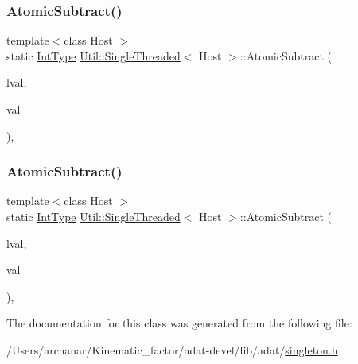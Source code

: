 \mbox{\label{classUtil_1_1SingleThreaded_a69e02798b76b46c5df8ed4cfe37ac9c5}} 
\subsubsection{\texorpdfstring{AtomicSubtract()}{AtomicSubtract()}\hspace{0.1cm}{\footnotesize\ttfamily [2/3]}}
{\footnotesize\ttfamily template$<$class Host $>$ \\
static \mbox{\hyperlink{classUtil_1_1SingleThreaded_a35932213fb0c15a7b67ced79bc2af4c6}{Int\+Type}} \mbox{\hyperlink{classUtil_1_1SingleThreaded}{Util\+::\+Single\+Threaded}}$<$ Host $>$\+::Atomic\+Subtract (\begin{DoxyParamCaption}\item[{volatile \mbox{\hyperlink{classUtil_1_1SingleThreaded_a35932213fb0c15a7b67ced79bc2af4c6}{Int\+Type}} \&}]{lval,  }\item[{\mbox{\hyperlink{classUtil_1_1SingleThreaded_a35932213fb0c15a7b67ced79bc2af4c6}{Int\+Type}}}]{val }\end{DoxyParamCaption})\hspace{0.3cm}{\ttfamily [inline]}, {\ttfamily [static]}}

\mbox{\label{classUtil_1_1SingleThreaded_a69e02798b76b46c5df8ed4cfe37ac9c5}} 
\subsubsection{\texorpdfstring{AtomicSubtract()}{AtomicSubtract()}\hspace{0.1cm}{\footnotesize\ttfamily [3/3]}}
{\footnotesize\ttfamily template$<$class Host $>$ \\
static \mbox{\hyperlink{classUtil_1_1SingleThreaded_a35932213fb0c15a7b67ced79bc2af4c6}{Int\+Type}} \mbox{\hyperlink{classUtil_1_1SingleThreaded}{Util\+::\+Single\+Threaded}}$<$ Host $>$\+::Atomic\+Subtract (\begin{DoxyParamCaption}\item[{volatile \mbox{\hyperlink{classUtil_1_1SingleThreaded_a35932213fb0c15a7b67ced79bc2af4c6}{Int\+Type}} \&}]{lval,  }\item[{\mbox{\hyperlink{classUtil_1_1SingleThreaded_a35932213fb0c15a7b67ced79bc2af4c6}{Int\+Type}}}]{val }\end{DoxyParamCaption})\hspace{0.3cm}{\ttfamily [inline]}, {\ttfamily [static]}}



The documentation for this class was generated from the following file\+:\begin{DoxyCompactItemize}
\item 
/\+Users/archanar/\+Kinematic\+\_\+factor/adat-\/devel/lib/adat/\mbox{\hyperlink{adat-devel_2lib_2adat_2singleton_8h}{singleton.\+h}}\end{DoxyCompactItemize}

